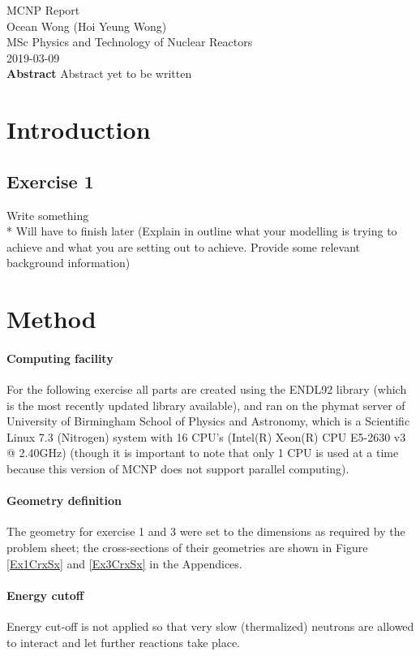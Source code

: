 \documentclass[a4paper, 12pt]{article}
\begin{document}
\begin{center}
MCNP Report										\\
Ocean Wong (Hoi Yeung Wong)						\\
MSc Physics and Technology of Nuclear Reactors	\\
2019-03-09 										\\
\textbf{Abstract}
Abstract yet to be written
\end{center}
\section{Introduction}
\subsection{Exercise 1}
Write something \\* Will have to finish later (Explain in outline what your modelling is trying to achieve and what you are setting out to achieve. Provide some relevant background information)
\section{Method}
\paragraph{Computing facility}For the following exercise all parts are created using the ENDL92 library (which is the most recently updated library available), and ran on the phymat server of University of Birmingham School of Physics and Astronomy, which is a Scientific Linux 7.3 (Nitrogen) system with 16 CPU's (Intel(R) Xeon(R) CPU E5-2630 v3 @ 2.40GHz) (though it is important to note that only 1 CPU is used at a time because this version of MCNP does not support parallel computing). 
\paragraph{Geometry definition} The geometry for exercise 1 and 3 were set to the dimensions as required by the problem sheet; the cross-sections of their geometries are shown in Figure \ref{Ex1CrxSx} and \ref{Ex3CrxSx} in the Appendices.
\paragraph{Energy cutoff}
Energy cut-off is not applied so that very slow (thermalized) neutrons are allowed to interact and let further reactions take place.
\end{document}
